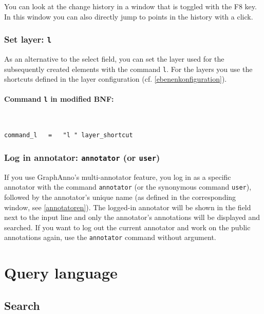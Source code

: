 \documentclass[12pt]{scrartcl}
\begin{document}
You can look at the change history in a window that is toggled with the F8 key.
In this window you can also directly jump to points in the history with a click.


\subsubsection{Set layer: \texttt{l}}\label{befehl-l}

As an alternative to the select field, you can set the layer used for the subsequently created elements with the command \texttt{l}.
For the layers you use the shortcuts defined in the layer configuration (cf. \ref{ebenenkonfiguration}).

\paragraph*{Command \texttt{l} in modified BNF:}
~
\begin{framed}
\begin{lstlisting}
command_l   =   "l " layer_shortcut
\end{lstlisting}
\end{framed}



\subsubsection{Log in annotator: \texttt{annotator} (or \texttt{user})}

If you use GraphAnno’s multi-annotator feature, you log in as a specific annotator with the command \texttt{annotator} (or the synonymous command \texttt{user}), followed by the annotator’s unique name (as defined in the corresponding window, see \ref{annotatoren}).
The logged-in annotator will be shown in the field next to the input line and only the annotator’s annotations will be displayed and searched.
If you want to log out the current annotator and work on the public annotations again, use the \texttt{annotator} command without argument.






\section{Query language}

\subsection{Search}
\end{document}
